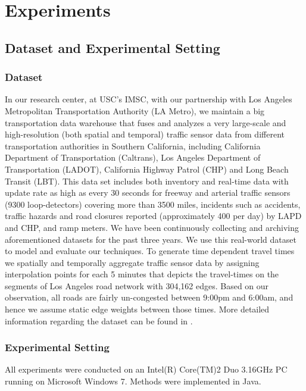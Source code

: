 \section{Experiments}
\label{sec:experiments}
\subsection{Dataset and Experimental Setting}
\subsubsection{Dataset}
\label{subsec:Dataset}
In our research center, at USC's IMSC, with our partnership with Los Angeles Metropolitan Transportation Authority (LA Metro), we maintain a big transportation data warehouse that fuses and analyzes a very large-scale and high-resolution (both spatial and temporal) traffic sensor data from different transportation authorities in Southern California, including California Department of Transportation (Caltrans), Los Angeles Department of Transportation (LADOT), California Highway Patrol (CHP) and Long Beach Transit (LBT).  This data set includes both inventory and real-time data with update rate as high as every 30 seconds for freeway and arterial traffic sensors (9300 loop-detectors) covering more than 3500 miles, incidents  such as accidents, traffic hazards and road closures reported (approximately 400 per day) by LAPD and CHP, and ramp meters. We have been continuously collecting and archiving aforementioned datasets for the past three years. We use this real-world dataset to model and evaluate our techniques. To generate time dependent travel times we spatially and temporally aggregate traffic sensor data by assigning interpolation points for each 5 minutes that depicts the travel-times on the segments of Los Angeles road network with 304,162 edges. Based on our observation, all roads are fairly un-congested between 9:00pm and 6:00am, and hence we assume static edge weights between those times. More detailed information regarding the dataset can be found in \cite{Jagadish14}.

\subsubsection{Experimental Setting}
All experiments were conducted on an Intel(R) Core(TM)2 Duo 3.16GHz PC running on Microsoft Windows 7. Methods were implemented in Java.

